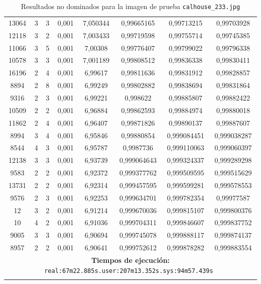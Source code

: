 \begin{longtable}{|c|c|c|c|c|c|c|c|}
13064 & 3 & 3 & 0,001 & 7,050344 & 0,99665165 & 0,99713215 & 0,99703928 \\
12118 & 3 & 2 & 0,001 & 7,003433 & 0,99719598 & 0,99755714 & 0,99745385 \\
11066 & 3 & 5 & 0,001 & 7,00308 & 0,99776407 & 0,99799022 & 0,99796338 \\
10578 & 3 & 3 & 0,001 & 7,001189 & 0,99808512 & 0,99836338 & 0,99830411 \\
16196 & 2 & 4 & 0,001 & 6,99617 & 0,99811636 & 0,99831912 & 0,99828857 \\
8894 & 2 & 8 & 0,001 & 6,99249 & 0,99802882 & 0,99838694 & 0,99831864 \\
9316 & 2 & 3 & 0,001 & 6,99221 & 0,998622 & 0,99885807 & 0,99882422 \\
10509 & 2 & 2 & 0,001 & 6,96884 & 0,99862593 & 0,99884974 & 0,99880018 \\
11862 & 2 & 4 & 0,001 & 6,96407 & 0,99871826 & 0,99890137 & 0,99887607 \\
8994 & 3 & 4 & 0,001 & 6,95846 & 0,99880854 & 0,999084451 & 0,999038287 \\
8544 & 4 & 3 & 0,001 & 6,95787 & 0,9987736 & 0,999110063 & 0,999060397 \\
12138 & 3 & 3 & 0,001 & 6,93739 & 0,999064643 & 0,999324337 & 0,999289298 \\
9583 & 2 & 2 & 0,001 & 6,92372 & 0,999377762 & 0,999509595 & 0,999515629 \\
13731 & 2 & 2 & 0,001 & 6,92314 & 0,999457595 & 0,999599281 & 0,999578553 \\
9576 & 2 & 3 & 0,001 & 6,92253 & 0,999634701 & 0,999782354 & 0,99977587 \\
12 & 3 & 2 & 0,001 & 6,91214 & 0,999670036 & 0,999815107 & 0,999800376 \\
10 & 4 & 2 & 0,001 & 6,91036 & 0,999704311 & 0,999846607 & 0,999837752 \\
9005 & 3 & 3 & 0,001 & 6,90694 & 0,999745078 & 0,999888117 & 0,999874137 \\
8957 & 2 & 2 & 0,001 & 6,90641 & 0,999752612 & 0,999878282 & 0,999883554 \\

\hline
\multicolumn{8}{|c|}{\textbf{Tiempos de ejecución:} \texttt{real:67m22.885s.user:207m13.352s.sys:94m57.439s
}}\\ \hline
\caption{Resultados no dominados para la imagen de prueba \texttt{calhouse\_233.jpg}}
\label{tab:calhouse_233}
\end{longtable}
\normalsize


